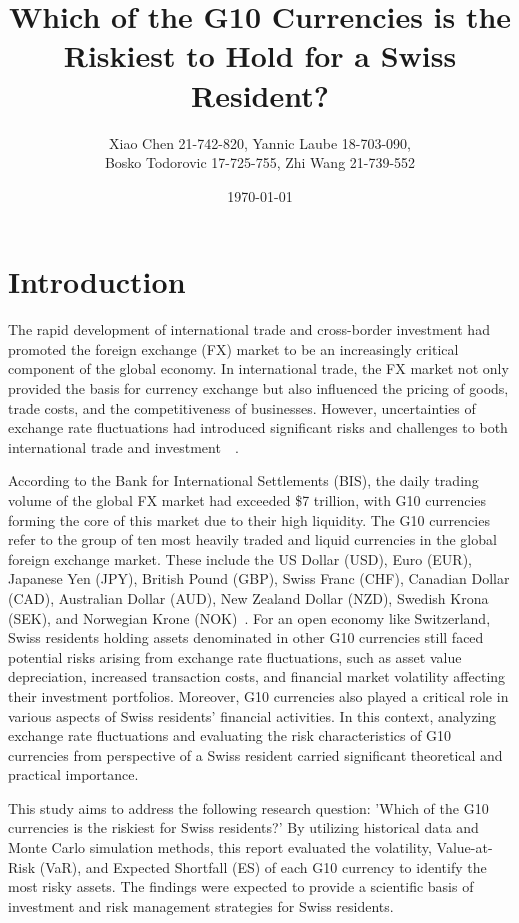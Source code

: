 \documentclass{article}
\title{\textbf{Which of the G10 Currencies is the Riskiest to Hold for a Swiss Resident?}}
\author{Xiao Chen 21-742-820, Yannic Laube 18-703-090, \\ Bosko Todorovic 17-725-755, Zhi Wang 21-739-552}
\date{\today}
\begin{document}
\maketitle
\section{Introduction}
The rapid development of international trade and cross-border investment had promoted the foreign exchange (FX) market to be an increasingly critical component of the global economy. In international trade, the FX market not only provided the basis for currency exchange but also influenced the pricing of goods, trade costs, and the competitiveness of businesses. However, uncertainties of exchange rate fluctuations had introduced significant risks and challenges to both international trade and investment~\cite{AUBOIN_RUTA_2013}~\cite{riker2020review}.

According to the Bank for International Settlements (BIS), the daily trading volume of the global FX market had exceeded \$7 trillion, with G10 currencies forming the core of this market due to their high liquidity. The G10 currencies refer to the group of ten most heavily traded and liquid currencies in the global foreign exchange market. These include the US Dollar (USD), Euro (EUR), Japanese Yen (JPY), British Pound (GBP), Swiss Franc (CHF), Canadian Dollar (CAD), Australian Dollar (AUD), New Zealand Dollar (NZD), Swedish Krona (SEK), and Norwegian Krone (NOK)~\cite{bis2022report}. For an open economy like Switzerland, Swiss residents holding assets denominated in other G10 currencies still faced potential risks arising from exchange rate fluctuations, such as asset value depreciation, increased transaction costs, and financial market volatility affecting their investment portfolios. Moreover, G10 currencies also played a critical role in various aspects of Swiss residents' financial activities. In this context, analyzing exchange rate fluctuations and evaluating the risk characteristics of G10 currencies from perspective of a Swiss resident carried significant theoretical and practical importance.

This study aims to address the following research question: 'Which of the G10 currencies is the riskiest for Swiss residents?' By utilizing historical data and Monte Carlo simulation methods, this report evaluated the volatility, Value-at-Risk (VaR), and Expected Shortfall (ES) of each G10 currency to identify the most risky assets. The findings were expected to provide a scientific basis of investment and risk management strategies for Swiss residents.
\end{document}
